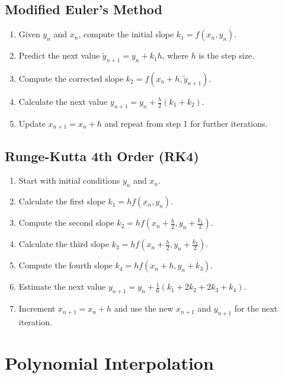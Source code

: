 \documentclass[10pt]{article}
\begin{document}
\begin{multicols}{2}
\subsection*{Modified Euler's Method}

\begin{enumerate}
    \item Given \( y_n \) and \( x_n \), compute the initial slope \( k_1 = f(x_n, y_n) \).
    \item Predict the next value \( \tilde{y}_{n+1} = y_n + k_1 h \), where \( h \) is the step size.
    \item Compute the corrected slope \( k_2 = f(x_n + h, \tilde{y}_{n+1}) \).
    \item Calculate the next value \( y_{n+1} = y_n + \frac{h}{2}(k_1 + k_2) \).
    \item Update \( x_{n+1} = x_n + h \) and repeat from step 1 for further iterations.
\end{enumerate}

\subsection*{Runge-Kutta 4th Order (RK4)}

\begin{enumerate}
    \item Start with initial conditions \( y_n \) and \( x_n \).
    \item Calculate the first slope \( k_1 = h f(x_n, y_n) \).
    \item Compute the second slope \( k_2 = h f(x_n + \frac{h}{2}, y_n + \frac{k_1}{2}) \).
    \item Calculate the third slope \( k_3 = h f(x_n + \frac{h}{2}, y_n + \frac{k_2}{2}) \).
    \item Compute the fourth slope \( k_4 = h f(x_n + h, y_n + k_3) \).
    \item Estimate the next value \( y_{n+1} = y_n + \frac{1}{6}(k_1 + 2k_2 + 2k_3 + k_4) \).
    \item Increment \( x_{n+1} = x_n + h \) and use the new \( x_{n+1} \) and \( y_{n+1} \) for the next iteration.
\end{enumerate}

\columnbreak

\section*{Polynomial Interpolation}


\end{multicols}
\end{document}
